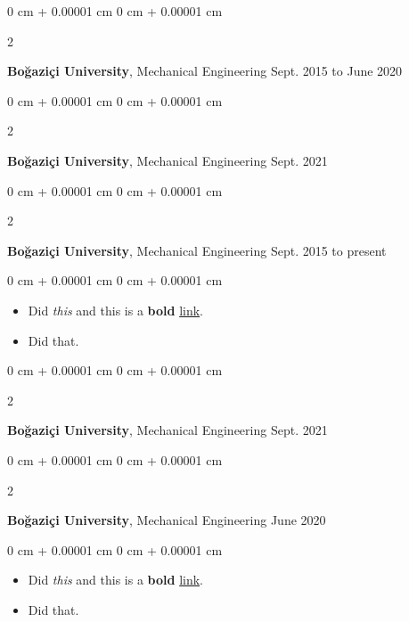 \documentclass[10pt, letterpaper]{article}
\newenvironment{highlights}{
    \begin{itemize}[
        topsep=0.10 cm,
        parsep=0.10 cm,
        partopsep=0pt,
        itemsep=0pt,
        leftmargin=0 cm + 10pt
    ]
}{
    \end{itemize}
} %
\newenvironment{onecolentry}{
    \begin{adjustwidth}{
        0 cm + 0.00001 cm
    }{
        0 cm + 0.00001 cm
    }
}{
    \end{adjustwidth}
} %
\newenvironment{twocolentry}[2][]{
    \onecolentry
    \def\secondColumn{#2}
    \setcolumnwidth{\fill, 4.5 cm}
    \begin{paracol}{2}
}{
    \switchcolumn \raggedleft \secondColumn
    \end{paracol}
    \endonecolentry
} %
\begin{document}
        \vspace{0.2 cm}

        \begin{twocolentry}{
            Sept. 2015 to June 2020
        }
            \textbf{Boğaziçi University}, Mechanical Engineering\end{twocolentry}



        \vspace{0.2 cm}

        \begin{twocolentry}{
            Sept. 2021
        }
            \textbf{Boğaziçi University}, Mechanical Engineering\end{twocolentry}



        \vspace{0.2 cm}

        \begin{twocolentry}{
            Sept. 2015 to present
        }
            \textbf{Boğaziçi University}, Mechanical Engineering\end{twocolentry}

        \vspace{0.10 cm}
        \begin{onecolentry}
            \begin{highlights}
                \item Did \textit{this} and this is a \textbf{bold} \href{https://example.com}{link}.
                \item Did that.
            \end{highlights}
        \end{onecolentry}


        \vspace{0.2 cm}

        \begin{twocolentry}{
            Sept. 2021
        }
            \textbf{Boğaziçi University}, Mechanical Engineering\end{twocolentry}



        \vspace{0.2 cm}

        \begin{twocolentry}{
            June 2020
        }
            \textbf{Boğaziçi University}, Mechanical Engineering\end{twocolentry}

        \vspace{0.10 cm}
        \begin{onecolentry}
            \begin{highlights}
                \item Did \textit{this} and this is a \textbf{bold} \href{https://example.com}{link}.
                \item Did that.
            \end{highlights}
        \end{onecolentry}
\end{document}
